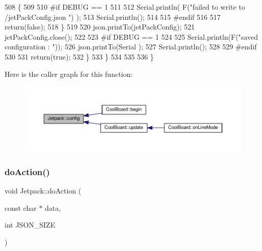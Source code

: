 \begin{DoxyCode}
508             \{
509             
510 \textcolor{preprocessor}{            #if DEBUG == 1 }
511 
512                 Serial.println( F(\textcolor{stringliteral}{"failed to write to /jetPackConfig.json "}) );
513                 Serial.println();
514             
515 \textcolor{preprocessor}{            #endif}
516                 
517                 \textcolor{keywordflow}{return}(\textcolor{keyword}{false});          
518             \}  
519 
520             json.printTo(jetPackConfig);
521             jetPackConfig.close();
522 
523 \textcolor{preprocessor}{        #if DEBUG == 1 }
524             
525             Serial.println(F(\textcolor{stringliteral}{"saved configuration : "}));
526             json.printTo(Serial );
527             Serial.println();       
528         
529 \textcolor{preprocessor}{        #endif}
530 
531             \textcolor{keywordflow}{return}(\textcolor{keyword}{true}); 
532         \}
533     \}   
534     
535 
536 \}
\end{DoxyCode}
Here is the caller graph for this function\+:\nopagebreak
\begin{figure}[H]
\begin{center}
\leavevmode
\includegraphics[width=350pt]{classJetpack_ab065ee83e244265a2223a22f3ee4a719_icgraph}
\end{center}
\end{figure}
\mbox{\label{classJetpack_a86d2e83436ef4b85f4c3a6e85ac785b0}} 
\subsubsection{\texorpdfstring{do\+Action()}{doAction()}}
{\footnotesize\ttfamily void Jetpack\+::do\+Action (\begin{DoxyParamCaption}\item[{const char $\ast$}]{data,  }\item[{int}]{J\+S\+O\+N\+\_\+\+S\+I\+ZE }\end{DoxyParamCaption})}

